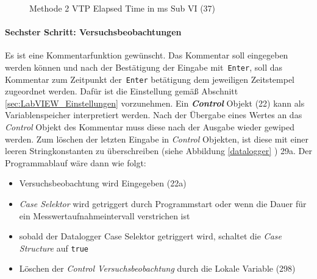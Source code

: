 \begin{figure}[!ht] %
     \hfill     
     \caption[]{Methode 2 \glqq VTP Elapsed Time in ms\grqq{} Sub VI (37)\\     	
  }
  \label{fig:vtp_elapsed_time}
   \end{figure}


\paragraph{Sechster Schritt: Versuchsbeobachtungen} Es ist eine Kommentarfunktion gewünscht. Das Kommentar soll eingegeben werden können und nach der Bestätigung der Eingabe mit\, \texttt{Enter}, soll das Kommentar zum Zeitpunkt der\, \texttt{Enter} betätigung dem jeweiligen Zeitstempel zugeordnet werden. Dafür ist die Einstellung gemäß Abschnitt \ref{sec:LabVIEW_Einstellungen} vorzunehmen. Ein \textit{\textbf{Control}} Objekt (22) kann als Variablenspeicher interpretiert werden. Nach der Übergabe eines Wertes an das \textit{Control} Objekt des Kommentar muss diese nach der Ausgabe wieder gewiped werden. Zum \glqq löschen\grqq{} der letzten Eingabe in \textit{Control} Objekten, ist diese mit einer leeren Stringkonstanten zu überschreiben (siehe Abbildung \ref{datalogger} ) 29a. Der Programmablauf wäre dann wie folgt:


\begin{itemize} %
\singlespacing
\item Versuchsbeobachtung wird Eingegeben (22a)
\item \textit{Case Selektor} wird getriggert durch Programmstart oder wenn die Dauer für ein Messwertaufnahmeintervall verstrichen ist
\item sobald der Datalogger Case Selektor getriggert wird, schaltet die \textit{Case Structure} auf \texttt{true}
\item Löschen der \textit{Control Versuchsbeobachtung} durch die Lokale Variable (298) 
\end{itemize}


